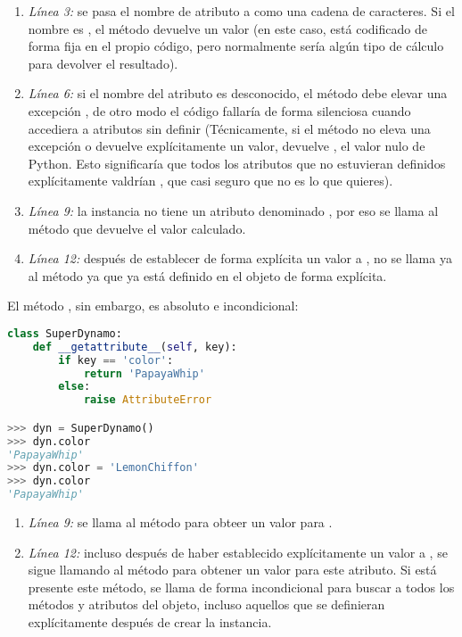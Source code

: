 \begin{enumerate}
  \item \emph{Línea 3:} se pasa el nombre de atributo a  como una cadena de caracteres. Si el nombre es , el método devuelve un valor (en este caso, está codificado de forma fija en el propio código, pero normalmente sería algún tipo de cálculo para devolver el resultado).
  \item \emph{Línea 6:} si el nombre del atributo es desconocido, el método debe elevar una excepción , de otro modo el código fallaría de forma silenciosa cuando accediera a atributos sin definir (Técnicamente, si el método no eleva una excepción o devuelve explícitamente un valor, devuelve , el valor nulo de Python. Esto significaría que todos los atributos que no estuvieran definidos explícitamente valdrían , que casi seguro que no es lo que quieres).
  \item \emph{Línea 9:} la instancia  no tiene un atributo denominado , por eso se llama al método  que devuelve el valor calculado.
  \item \emph{Línea 12:} después de establecer de forma explícita un valor a , no se llama ya al método  ya que  ya está definido en el objeto de forma explícita.
\end{enumerate}

El método , sin embargo, es absoluto e incondicional:


\begin{lstlisting}[language=Python,breaklines=true,mathescape=false]
class SuperDynamo:
    def __getattribute__(self, key):
        if key == 'color':
            return 'PapayaWhip'
        else:
            raise AttributeError

>>> dyn = SuperDynamo()
>>> dyn.color                      
'PapayaWhip'
>>> dyn.color = 'LemonChiffon'
>>> dyn.color                     
'PapayaWhip'
\end{lstlisting}


\begin{enumerate}
  \item \emph{Línea 9:} se llama al método  para obteer un valor para .
  \item \emph{Línea 12:} incluso después de haber establecido explícitamente un valor a , se sigue llamando al método  para obtener un valor para este atributo. Si está presente este método, se llama de forma incondicional para buscar a todos los métodos y atributos del objeto, incluso aquellos que se definieran explícitamente después de crear la instancia.
\end{enumerate}

